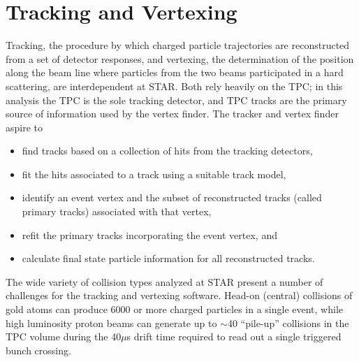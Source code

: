 \section{Tracking and Vertexing}

Tracking, the procedure by which charged particle trajectories are
reconstructed from a set of detector responses, and vertexing, the
determination of the position along the beam line where particles from the two
beams participated in a hard scattering, are interdependent at STAR. Both rely
heavily on the TPC; in this analysis the TPC is the sole tracking detector,
and TPC tracks are the primary source of information used by the vertex
finder. The tracker \cite{Rose:2003wx} and vertex finder
\cite{vertex-finder-starnote} aspire to
%
\begin{itemize}
  \item find tracks based on a collection of hits from the tracking detectors,
  \item fit the hits associated to a track using a suitable track model,
  \item identify an event vertex and the subset of reconstructed tracks (called primary tracks) associated with that vertex,
  \item refit the primary tracks incorporating the event vertex, and
  \item calculate final state particle information for all reconstructed tracks.
\end{itemize}
%
The wide variety of collision types analyzed at STAR present a number of
challenges for the tracking and vertexing software. Head-on (central)
collisions of gold atoms can produce 6000 or more charged particles in a
single event, while high luminosity proton beams can generate up to $\sim$40
``pile-up'' collisions in the TPC volume during the 40$\mu$s drift time
required to read out a single triggered bunch crossing.

